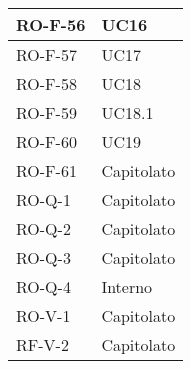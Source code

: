 \begin{center}
\begin{tabular}{ |m{8em}|m{13em}| }
    \hline
    RO-F-56  &  UC16 \\
    \hline
    RO-F-57  &  UC17 \\
    \hline
    RO-F-58  &  UC18 \\
    \hline
    RO-F-59  &  UC18.1 \\
    \hline
    RO-F-60  &  UC19 \\
    \hline
    RO-F-61  &  Capitolato \\
    \hline
    RO-Q-1  &  Capitolato \\
    \hline
    RO-Q-2  &  Capitolato \\
    \hline
    RO-Q-3  &  Capitolato \\
    \hline
    RO-Q-4  &  Interno \\
    \hline
    RO-V-1  &  Capitolato \\
    \hline
    RF-V-2  &  Capitolato \\
    \hline
\end{tabular}
\end{center}